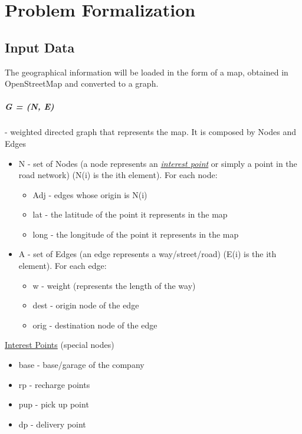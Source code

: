 \chapter{Problem Formalization}


\section{Input Data}
The geographical information will be loaded in the form of a map, obtained in OpenStreetMap and converted to a graph.
\paragraph{G = (N, E)} - weighted directed graph that represents the map. It is composed by Nodes and Edges
\begin{itemize}

	\item N - set of Nodes (a node represents an \uline{\textit{interest point}} or simply a point in the road network) (N(i) is the ith element). For each node:
\begin{itemize}
	\item Adj - edges whose origin is N(i)
	\item lat - the latitude of the point it represents in the map
	\item long - the longitude of the point it represents in the map
\end{itemize}

	\item A - set of Edges (an edge represents a way/street/road) (E(i) is the ith element). For each edge:
\begin{itemize}
	\item w - weight (represents the length of the way)
	\item dest - origin node of the edge
	\item orig - destination node of the edge
\end{itemize}

\end{itemize}

\uline{Interest Points} (special nodes)
\begin{itemize}
	\item base - base/garage of the company
	\item rp - recharge points
	\item pup - pick up point
	\item dp - delivery point
\end{itemize}

